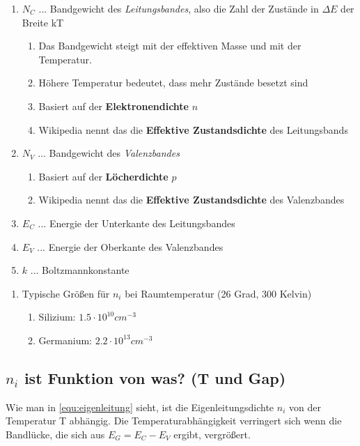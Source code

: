 \documentclass{article}
\begin{document}
	\begin{enumerate}
	    \item $N_C$ ... Bandgewicht des \emph{Leitungsbandes}, also die Zahl der Zustände in $\Delta E$ der Breite kT
	    \begin{enumerate}
	        \item Das Bandgewicht steigt mit der effektiven Masse und mit der Temperatur.
	        \item Höhere Temperatur bedeutet, dass mehr Zustände besetzt sind
	        \item Basiert auf der \textbf{Elektronendichte} $n$
	        \item Wikipedia nennt das die \textbf{Effektive Zustandsdichte} des Leitungsbands
	    \end{enumerate}
	    \item $N_V$ ... Bandgewicht des \emph{Valenzbandes}
	    \begin{enumerate}
	        \item Basiert auf der \textbf{Löcherdichte} $p$
	        \item Wikipedia nennt das die \textbf{Effektive Zustandsdichte} des Valenzbandes
	    \end{enumerate}
	    \item $E_C$ ... Energie der Unterkante des Leitungsbandes
	    \item $E_V$ ... Energie der Oberkante des Valenzbandes
	    \item $k$ ... Boltzmannkonstante
	\end{enumerate}
	
	\begin{enumerate}
	    \item Typische Größen für $n_i$ bei Raumtemperatur (26 Grad, 300 Kelvin)
	    \begin{enumerate}
	        \item Silizium: $1.5 \cdot 10^{10} cm^{-3}$
	        \item Germanium: $2.2 \cdot 10^{13} cm^{-3}$
	    \end{enumerate}
	\end{enumerate}
	
	\subsection{$n_i$ ist Funktion von was? (T und Gap)}
    Wie man in \autoref{equ:eigenleitung} sieht, ist die Eigenleitungsdichte $n_i$ von der Temperatur T abhängig.
    Die Temperaturabhängigkeit verringert sich wenn die Bandlücke, die sich aus $E_G = E_C - E_V$ ergibt, vergrößert. 
    
\end{document}
